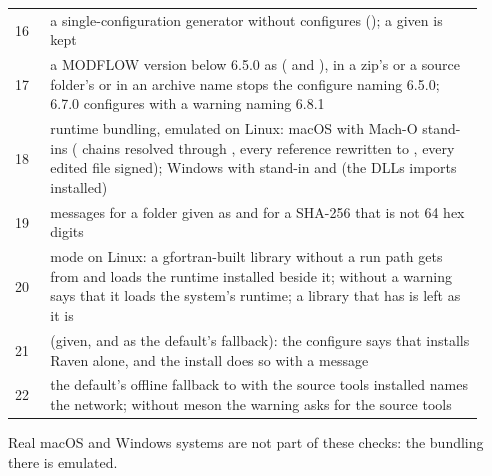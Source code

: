 \begin{longtable}{P{0.07\linewidth}P{0.86\linewidth}}
16 & a single-configuration generator without  configures  (); a given  is kept\\
17 & a MODFLOW version below 6.5.0 as  ( and ), in a zip's or a source folder's  or in an archive name stops the configure naming 6.5.0; 6.7.0 configures with a warning naming 6.8.1\\
18 & runtime bundling, emulated on Linux: macOS with Mach-O stand-ins ( chains resolved through , every reference rewritten to , every edited file signed); Windows with stand-in  and  (the DLLs  imports installed)\\
19 & messages for a folder given as  and for a SHA-256 that is not 64 hex digits\\
20 &  mode on Linux: a gfortran-built library without a run path gets  from  and loads the runtime installed beside it; without  a warning says that it loads the system's runtime; a library that has  is left as it is\\
21 &  (given, and as the default's fallback): the configure says that  installs Raven alone, and the install does so with a message\\
22 & the default's offline fallback to  with the source tools installed names the network; without meson the warning asks for the source tools\\\bottomrule
\end{longtable}
\noindent Real macOS and Windows systems are not part of these checks: the bundling there is emulated.


